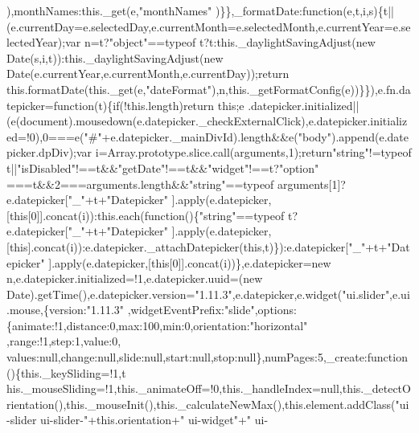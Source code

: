 \begin{DoxyCode}
{{      ),monthNames:this.\_get(e,"}monthNames\textcolor{stringliteral}{"
      )\}\},\_formatDate:function(e,t,i,s)\{t||(e.currentDay=e.selectedDay,e.currentMonth=e.selectedMonth,e.currentYear=e.selectedYear);var n=t?"}\textcolor{keywordtype}{object}\textcolor{stringliteral}{"==typeof t?t:this.\_daylightSavingAdjust(new
       Date(s,i,t)):this.\_daylightSavingAdjust(new Date(e.currentYear,e.currentMonth,e.currentDay));return
       this.formatDate(this.\_get(e,"}dateFormat\textcolor{stringliteral}{"),n,this.\_getFormatConfig(e))\}\}),e.fn.datepicker=function(t)\{if(!this.length)return
       this;e
      .datepicker.initialized||(e(document).mousedown(e.datepicker.\_checkExternalClick),e.datepicker.initialized=!0),0===e("}#\textcolor{stringliteral}{"+e.datepicker.\_mainDivId).length&&e("}body\textcolor{stringliteral}{").append(e.datepicker.dpDiv);var
       i=Array.prototype.slice.call(arguments,1);return"}\textcolor{keywordtype}{string}\textcolor{stringliteral}{"!=typeof t||"}isDisabled\textcolor{stringliteral}{"!==t&&"}getDate\textcolor{stringliteral}{"!==t&&"}widget\textcolor{stringliteral}{"!==t?"}option\textcolor{stringliteral}{"
      ===t&&2===arguments.length&&"}\textcolor{keywordtype}{string}\textcolor{stringliteral}{"==typeof arguments[1]?e.datepicker["}\_\textcolor{stringliteral}{"+t+"}Datepicker\textcolor{stringliteral}{"
      ].apply(e.datepicker,[this[0]].concat(i)):this.each(function()\{"}\textcolor{keywordtype}{string}\textcolor{stringliteral}{"==typeof t?e.datepicker["}\_\textcolor{stringliteral}{"+t+"}Datepicker\textcolor{stringliteral}{"
      ].apply(e.datepicker,[this].concat(i)):e.datepicker.\_attachDatepicker(this,t)\}):e.datepicker["}\_\textcolor{stringliteral}{"+t+"}Datepicker\textcolor{stringliteral}{"
      ].apply(e.datepicker,[this[0]].concat(i))\},e.datepicker=new n,e.datepicker.initialized=!1,e.datepicker.uuid=(new
       Date).getTime(),e.datepicker.version="}1.11.3\textcolor{stringliteral}{",e.datepicker,e.widget("}ui.slider\textcolor{stringliteral}{",e.ui.mouse,\{version:"}1.11.3\textcolor{stringliteral}{"
      ,widgetEventPrefix:"}slide\textcolor{stringliteral}{",options:\{animate:!1,distance:0,max:100,min:0,orientation:"}horizontal\textcolor{stringliteral}{"
      ,range:!1,step:1,value:0,
      values:null,change:null,slide:null,start:null,stop:null\},numPages:5,\_create:function()\{this.\_keySliding=!1,t
      his.\_mouseSliding=!1,this.\_animateOff=!0,this.\_handleIndex=null,this.\_detectOrientation(),this.\_mouseInit(),this.\_calculateNewMax(),this.element.addClass("}ui-slider ui-slider-\textcolor{stringliteral}{"+this.orientation+"} ui-widget\textcolor{stringliteral}{"+"} ui-
}
\end{DoxyCode}
